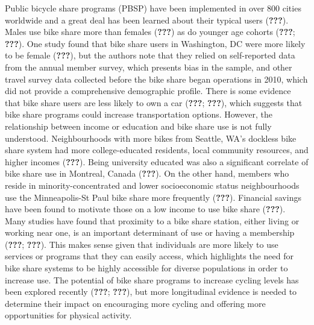 \documentclass[]{elsarticle} %
\begin{document}
Public bicycle share programs (PBSP) have been implemented in over 800
cities worldwide and a great deal has been learned about their typical
users ({\textbf{???}}). Males use bike share more than females
({\textbf{???}}) as do younger age cohorts ({\textbf{???}};
{\textbf{???}}). One study found that bike share users in Washington, DC
were more likely to be female ({\textbf{???}}), but the authors note
that they relied on self-reported data from the annual member survey,
which presents bias in the sample, and other travel survey data
collected before the bike share began operations in 2010, which did not
provide a comprehensive demographic profile. There is some evidence that
bike share users are less likely to own a car ({\textbf{???}};
{\textbf{???}}), which suggests that bike share programs could increase
transportation options. However, the relationship between income or
education and bike share use is not fully understood. Neighbourhoods
with more bikes from Seattle, WA's dockless bike share system had more
college-educated residents, local community resources, and higher
incomes ({\textbf{???}}). Being university educated was also a
significant correlate of bike share use in Montreal, Canada
({\textbf{???}}). On the other hand, members who reside in
minority-concentrated and lower socioeconomic status neighbourhoods use
the Minneapolis-St Paul bike share more frequently ({\textbf{???}}).
Financial savings have been found to motivate those on a low income to
use bike share ({\textbf{???}}). Many studies have found that proximity
to a bike share station, either living or working near one, is an
important determinant of use or having a membership ({\textbf{???}};
{\textbf{???}}). This makes sense given that individuals are more likely
to use services or programs that they can easily access, which
highlights the need for bike share systems to be highly accessible for
diverse populations in order to increase use. The potential of bike
share programs to increase cycling levels has been explored recently
({\textbf{???}}; {\textbf{???}}), but more longitudinal evidence is
needed to determine their impact on encouraging more cycling and
offering more opportunities for physical activity.
\end{document}
